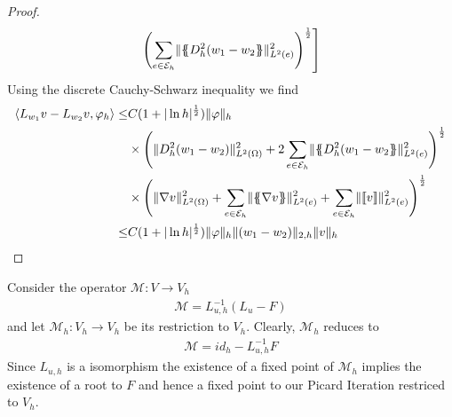 \begin{proof}
\begin{align}
				\left. \left(\sum_{e \in \mathcal{E}_h} \lVert \{\!\!\{ D_h^2 (w_1-w_2 \}\!\!\} \rVert_{L^2(e)}^2 \right)^{\frac 1 2} 
			\right] \label{eq: difference estimate number two}
	\end{align}
	Using the discrete Cauchy-Schwarz inequality we find
	\begin{align}
	\bilin{L_{w_1}v- L_{w_2} v} {\varphi_h} 
		\leq& C (1+|\ln h|^{\frac 1 2})\eNorm{\varphi} 
		\nonumber \\
		&\times
			\left(
				\LTwonorm{\hess{(w_1 -w_2)}}^2 
				+ 2\sum_{e \in \edges} \LTwonormE{\average{\hess{(w_1-w_2}}}^2
			\right)^{\frac 1 2} \nonumber \\
	   	&\times
			\left(
			\LTwonorm{\nabla v}^2 
			+ \sum_{e \in \edges} \LTwonormE{\average{\nabla v}}^2
			+\sum_{e \in \edges} \LTwonormE{\jump v}^2
			\right)^{\frac 1 2} \nonumber \\
		\leq& C (1+|\ln h|^{\frac 1 2})\eNorm{\varphi} 	\eNormDTwo{{(w_1-w_2)}} \eNorm{v}
	\end{align}
 \phantom{blub}
\end{proof}

Consider the operator $\mathcal M: V \rightarrow V_h$
\begin{align}
	\mathcal M = L_{u,h}^{-1}(L_{u} - F)
\end{align}
and let $\mathcal M_h:V_h \rightarrow V_h$ be its restriction to $V_h$. Clearly, $\mathcal M_h$ reduces to 
\begin{align}
\mathcal M = id_h - L_{u,h}^{-1}F
\end{align}
Since $L_{u,h}$ is a isomorphism the existence of a fixed point of $\mathcal M_h$ implies the existence of a root to $F$ and hence a fixed point to our Picard Iteration restriced to $V_h$.

